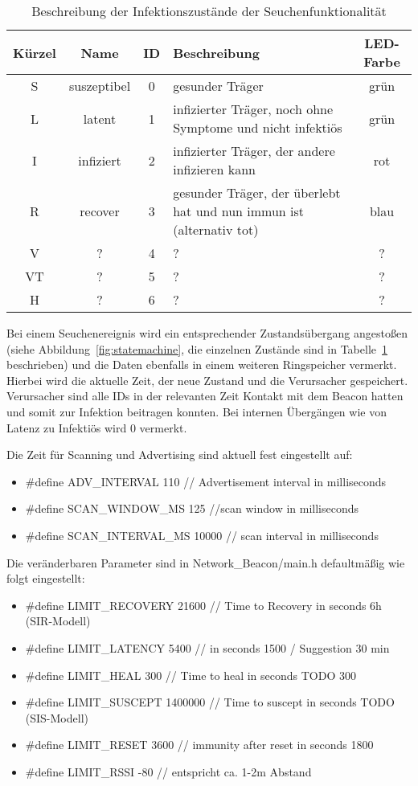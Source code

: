 \documentclass[11pt,ngerman]{scrartcl} %
\begin{document}
\begin{table}[h]
  \centering
  \begin{tabular}{cccp{7cm}c}
    Kürzel & Name & ID & Beschreibung & LED-Farbe \\\hline
    S & suszeptibel & 0 & gesunder Träger & grün \\
    L & latent & 1 & infizierter Träger, noch ohne Symptome und nicht infektiös & grün \\
    I & infiziert & 2 & infizierter Träger, der andere infizieren kann & rot \\
    R & recover & 3 & gesunder Träger, der überlebt hat und nun immun ist (alternativ tot) & blau \\
    V & ? & 4 & ? & ? \\
    VT & ? & 5 & ? & ? \\
    H & ? & 6 & ? & ? \\
  \end{tabular}
  \caption{Beschreibung der Infektionszustände der Seuchenfunktionalität}
  \label{tab:infectioninfo}
\end{table}

Bei einem Seuchenereignis wird ein entsprechender Zustandsübergang angestoßen (siehe Abbildung~\ref{fig:statemachine}, die einzelnen Zustände sind in Tabelle~\ref{tab:infectioninfo} beschrieben) und die Daten ebenfalls in einem weiteren Ringspeicher vermerkt. Hierbei wird die aktuelle Zeit, der neue Zustand und die Verursacher gespeichert. Verursacher sind alle IDs in der relevanten Zeit Kontakt mit dem Beacon hatten und somit zur Infektion beitragen konnten. Bei internen Übergängen wie von Latenz zu Infektiös wird 0 vermerkt.

Die Zeit für Scanning und Advertising sind aktuell fest eingestellt auf:
\begin{itemize}
\item \#define ADV\_INTERVAL				110 // Advertisement interval in milliseconds
\item \#define SCAN\_WINDOW\_MS				125  //scan window in milliseconds
\item \#define SCAN\_INTERVAL\_MS			10000  // scan interval in milliseconds
\end{itemize}


Die veränderbaren Parameter sind in Network\_Beacon/main.h defaultmäßig wie folgt eingestellt:
\begin{itemize}
\item \#define LIMIT\_RECOVERY				21600 // Time to Recovery in seconds     6h (SIR-Modell)
\item \#define LIMIT\_LATENCY				5400 //  in seconds 1500  / Suggestion 30 min
\item \#define LIMIT\_HEAL					300 // Time to heal in seconds TODO 300
\item \#define LIMIT\_SUSCEPT				1400000 // Time to suscept in seconds TODO (SIS-Modell)
\item \#define LIMIT\_RESET					3600 // immunity after reset in seconds 1800
\item \#define LIMIT\_RSSI		 			-80 // entspricht ca. 1-2m Abstand
\end{itemize}
\end{document}
